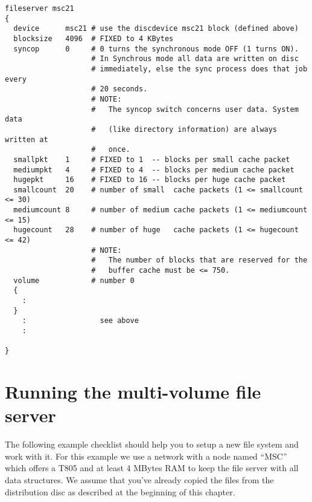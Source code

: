 \begin{listing}
  \begin{verbatim}
fileserver msc21
{
  device      msc21 # use the discdevice msc21 block (defined above)
  blocksize   4096  # FIXED to 4 KBytes
  syncop      0     # 0 turns the synchronous mode OFF (1 turns ON).
                    # In Synchrous mode all data are written on disc
                    # immediately, else the sync process does that job every
                    # 20 seconds.
                    # NOTE:
                    #   The syncop switch concerns user data. System data
                    #   (like directory information) are always written at
                    #   once. 
  smallpkt    1     # FIXED to 1  -- blocks per small cache packet
  mediumpkt   4     # FIXED to 4  -- blocks per medium cache packet
  hugepkt     16    # FIXED to 16 -- blocks per huge cache packet
  smallcount  20    # number of small  cache packets (1 <= smallcount  <= 30)
  mediumcount 8     # number of medium cache packets (1 <= mediumcount <= 15)
  hugecount   28    # number of huge   cache packets (1 <= hugecount   <= 42)
                    # NOTE:
                    #   The number of blocks that are reserved for the
                    #   buffer cache must be <= 750.
  volume            # number 0
  {
    :
  }
    :                 see above
    :
    
}
  \end{verbatim}
\end{listing}

\section{Running the multi-volume file server}\label{sec:runpfs}

The following example checklist should help you to setup a new file system and 
work with it. For this example we use a network with a node named ``MSC''
which offers a T805 and at least 4 MBytes RAM to keep the file server with all
data structures. We assume that you've already copied the files from the
distribution disc as described at the beginning of this chapter.


